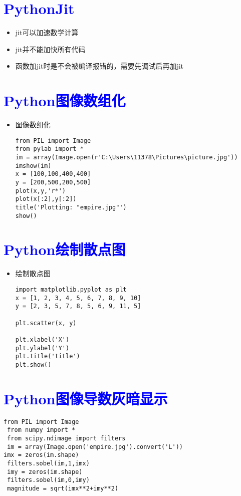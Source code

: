 \documentclass{article}
\begin{document}
\section{\textcolor{blue}{PythonJit}}
\begin{itemize}
\item jit可以加速数学计算
\item jit并不能加快所有代码
\item 函数加jit时是不会被编译报错的，需要先调试后再加jit
\end{itemize}
\section{\textcolor{blue}{Python图像数组化}}
\begin{itemize}
\item 图像数组化\\
\begin{lstlisting}
from PIL import Image
from pylab import *
im = array(Image.open(r'C:\Users\11378\Pictures\picture.jpg'))
imshow(im)
x = [100,100,400,400]
y = [200,500,200,500]
plot(x,y,'r*')
plot(x[:2],y[:2])
title('Plotting: "empire.jpg"')
show()
\end{lstlisting}
\end{itemize}
\section{\textcolor{blue}{Python绘制散点图}}
\begin{itemize}
\item 绘制散点图
\begin{lstlisting}  
import matplotlib.pyplot as plt  
x = [1, 2, 3, 4, 5, 6, 7, 8, 9, 10]  
y = [2, 3, 5, 7, 8, 5, 6, 9, 11, 5] 
  
plt.scatter(x, y)
  
plt.xlabel('X')    
plt.ylabel('Y')  
plt.title('title')  
plt.show()
\end{lstlisting}
\end{itemize}
\section{\textcolor{blue}{Python图像导数灰暗显示}}
\begin{lstlisting}
from PIL import Image
 from numpy import *
 from scipy.ndimage import filters
 im = array(Image.open('empire.jpg').convert('L'))
imx = zeros(im.shape)
 filters.sobel(im,1,imx)
 imy = zeros(im.shape)
 filters.sobel(im,0,imy)
 magnitude = sqrt(imx**2+imy**2)
\end{lstlisting}
\end{document}
